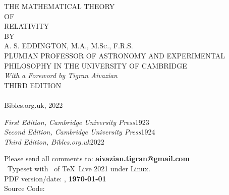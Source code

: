 \documentclass[12pt]{book}
\begin{document}
\MainMatter

\thispagestyle{empty}
\vspace*{1ex}
\begin{center}
\parttitlefont
\booktitlefontsize THE MATHEMATICAL THEORY\\
\medskip
\large OF\\
\medskip
\booktitlefontsize RELATIVITY\\
\bigskip
\titlefont
\normalsize BY \\
\authortitlefontsize A. S. EDDINGTON, M.A., \textsc{M.Sc.}, F.R.S.\\
\medskip
\scriptsize PLUMIAN PROFESSOR OF ASTRONOMY AND EXPERIMENTAL\\
PHILOSOPHY IN THE UNIVERSITY OF CAMBRIDGE\\
{\normalsize\itshape With a Foreword by Tigran Aivazian}\\
\small THIRD EDITION\\
\titlesepbig\\[2ex]
\Large Bibles.org.uk, 2022\\
\end{center}
\newpage\thispagestyle{empty}
\hfill
\parbox{8.5cm}{%
\begin{center}
\textit{First Edition, Cambridge University Press}\hfill1923\\
\medskip
\textit{Second Edition, Cambridge University Press}\hfill1924\\
\medskip
\textit{Third Edition, Bibles.org.uk}\hfill2022\\
\end{center}
}
\hfill
{}
\begin{center}
Please send all comments to: {\makeatletter\upshape\bfseries aivazian.tigran@gmail.com\makeatother}\\[1ex]
\tux\ Typeset with \XeLaTeX\ of \TeX\ Live 2021 under Linux.\\
PDF version/date: , \textbf{\today{}}\\
Source Code: 
\end{center}

\TableofContents
\end{document}
